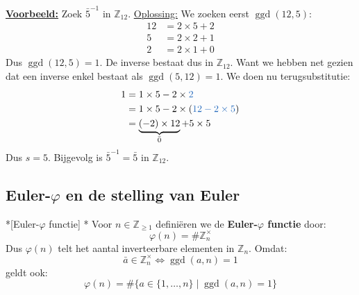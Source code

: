 \textbf{\underline{Voorbeeld:}} Zoek $\bar{5}^{-1}$ in $\mathbb{Z}_{12}$.\newline
\underline{Oplossing:} We zoeken eerst $\operatorname{ggd}(12,5)$:
\begin{equation*}
    \begin{aligned}
        12 &= 2 \times 5 + 2 \\
        5  &= 2 \times 2 + 1 \\
        2  &= 2 \times 1 + 0
    \end{aligned}
\end{equation*}
Dus $\operatorname{ggd}(12,5)=1$. De inverse bestaat dus in $\mathbb{Z}_{12}$. Want we hebben net gezien dat een inverse enkel bestaat als $\operatorname{ggd}(5,12)=1$. We doen nu terugsubstitutie:
\begin{equation*}
    \begin{aligned}
        1 &= 1 \times 5 - 2 \times \textcolor{NavyBlue}{2} \\
          &= 1 \times 5 - 2 \times (\textcolor{NavyBlue}{12 - 2 \times 5}) \\
          &= \underbrace{(-2) \times 12}_{\bar{0}} + 5 \times 5
    \end{aligned}
\end{equation*}
Dus $s=5$. Bijgevolg is $\bar{5}^{-1} = \bar{5}$ in $\mathbb{Z}_{12}$.

\subsection{Euler-\texorpdfstring{$\varphi$}{phi} en de stelling van Euler}

\begin{nicedefinition}*[Euler-$\varphi$ functie]
    \nextpart[]*
    Voor $n\in \mathbb{Z}_{\geq 1}$ definiëren we de \textcolor{PineGreen!75!black}{\textbf{Euler-$\varphi$ functie}} door:
    \begin{equation*}
        \varphi(n) = \#\mathbb{Z}_n^{\times}
    \end{equation*}
    Dus $\varphi(n)$ telt het aantal inverteerbare elementen in $\mathbb{Z}_n$. Omdat:
    \begin{equation*}
        \bar{a} \in \mathbb{Z}_n^\times \iff \operatorname{ggd}(a,n) = 1
    \end{equation*}
    geldt ook:
    \begin{equation*}
        \varphi(n) = \#\{a \in \{1, \dots, n\} \mid \operatorname{ggd}(a,n) = 1\}
    \end{equation*}
\end{nicedefinition}

